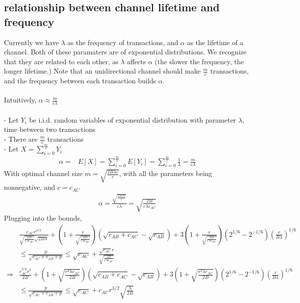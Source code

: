\documentclass[12pt]{article}
\theoremstyle{plain}
\theoremstyle{remark}
\theoremstyle{definition}
\renewcommand{\leq}{\leqslant}
\renewcommand{\leq}{\leqslant}
\begin{document}
\subsection{relationship between channel lifetime and frequency}
Currently we have $\lambda$ as the frequency of transactions, and $\alpha$ as the lifetime of a channel. Both of these paramaters are of exponential distributions. We recognize that they are related to each other, as $\lambda$ affects $\alpha$ (the slower the frequency, the longer lifetime.) Note that an unidirectional channel should make $\frac{m}{c}$ transactions, and the frequency between each transaction builds $\alpha$. 
\\ 
\\ Intuitively, $\alpha \approx \frac{m}{c\lambda}$
\\ 
\\ - Let ${Y_i}$ be i.i.d. random variables of exponential distribution with parameter $\lambda$, time between two transactions
\\ - There are $\frac{m}{c}$ transactions
\\ - Let $X=\sum_{i=0}^{\frac{m}{c}} Y_i$
\begin{align}
  \alpha = &E[X]=\sum_{i=0}^{\frac{m}{c}} E[Y_i] = \sum_{i=0}^{\frac{m}{c}} \frac{1}{\lambda} = \frac{m}{c\lambda}
\end{align}
With optimal channel size $m=\sqrt{\frac{2B\lambda c}{r}}$, with all the parameters being nonnegative, and $c=c_{AC}$
\begin{align}
  \alpha =\frac{\sqrt{\frac{2B\lambda c}{r}}}{c\lambda} = \sqrt{\frac{2B}{r\lambda c_{AC}}}
\end{align}
Plugging into the bounds,
\begin{align}
  &\frac{c_{AC}r^{3/2}}{\sqrt{\frac{2B}{r\lambda c_{AC}}}\sqrt{2B\lambda} } + (1+\frac{r}{\sqrt{\frac{2B}{r\lambda c_{AC}}}})(\sqrt{c_{AB}+ c_{AC}}-\sqrt{c_{AB}})+ 3(1+\frac{r}{\sqrt{\frac{2B}{r\lambda c_{AC}}}})(2^{1/6}-2^{-1/6})(\frac{r}{B\lambda})^{1/6} \\
  & \leq \frac{p}{\sqrt{c_{AC}+c_{AB}+p}} \leq \sqrt{c_{AC}}+\frac{\sqrt{c_{AC}}r}{\sqrt{\frac{2B}{r\lambda c_{AC}}}}\\
  \Rightarrow &\frac{c_{AC}^{3/2}r^2}{2B} + (1+\sqrt{\frac{r^3\lambda c_{AC}}{2B}})(\sqrt{c_{AB}+ c_{AC}}-\sqrt{c_{AB}})+ 3(1+\sqrt{\frac{r^3\lambda c_{AC}}{2B}})(2^{1/6}-2^{-1/6})(\frac{r}{B\lambda})^{1/6} \\
  & \leq \frac{p}{\sqrt{c_{AC}+c_{AB}+p}} \leq \sqrt{c_{AC}}+c_{AC}r^{3/2}\sqrt{\frac{\lambda }{2B}}
\end{align}
\end{document}
